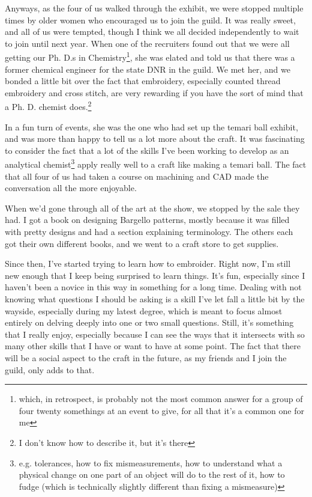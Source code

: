 \documentclass[12pt]{article}[titlepage]
\newcommand{\1}{\={a}}
\newcommand{\2}{\={e}}
\newcommand{\3}{\={\i}}
\newcommand{\4}{\=o}
\newcommand{\5}{\=u}
\newcommand{\6}{\={A}}
\renewcommand{\,}{\textsuperscript{,}}
\begin{document}
Anyways, as the four of us walked through the exhibit, we were stopped multiple times by older women who encouraged us to join the guild.
It was really sweet, and all of us were tempted, though I think we all decided independently to wait to join until next year.
When one of the recruiters found out that we were all getting our Ph. D.s in Chemistry\footnote{which, in retrospect, is probably not the most common answer for a group of four twenty somethings at an event to give, for all that it's a common one for me}, she was elated and told us that there was a former chemical engineer for the state DNR in the guild.
We met her, and we bonded a little bit over the fact that embroidery, especially counted thread embroidery and cross stitch, are very rewarding if you have the sort of mind that a Ph. D. chemist does.\footnote{I don't know how to describe it, but it's there}

In a fun turn of events, she was the one who had set up the temari ball exhibit, and was more than happy to tell us a lot more about the craft.
It was fascinating to consider the fact that a lot of the skills I've been working to develop as an analytical chemist\footnote{e.g. tolerances, how to fix mismeasurements, how to understand what a physical change on one part of an object will do to the rest of it, how to fudge (which is technically slightly different than fixing a mismeasure)} apply really well to a craft like making a temari ball.
The fact that all four of us had taken a course on machining and CAD made the conversation all the more enjoyable.

When we'd gone through all of the art at the show, we stopped by the sale they had.
I got a book on designing Bargello patterns, mostly because it was filled with pretty designs and had a section explaining terminology.
The others each got their own different books, and we went to a craft store to get supplies.

Since then, I've started trying to learn how to embroider.
Right now, I'm still new enough that I keep being surprised to learn things.
It's fun, especially since I haven't been a novice in this way in something for a long time.
Dealing with not knowing what questions I should be asking is a skill I've let fall a little bit by the wayside, especially during my latest degree, which is meant to focus almost entirely on delving deeply into one or two small questions.
Still, it's something that I really enjoy, especially because I can see the ways that it intersects with so many other skills that I have or want to have at some point.
The fact that there will be a social aspect to the craft in the future, as my friends and I join the guild, only adds to that.
\end{document}
